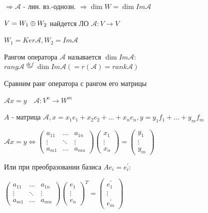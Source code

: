 \documentclass[12pt]{article}
\begin{document}
    $\Longrightarrow \mathcal{A}$ - лин. вз.-однозн. $\Longrightarrow \dim W = \dim Im \mathcal{A}$

    $V = W_1 \oplus W_2$ найдется ЛО $\mathcal{A} : V \rightarrow V$

    $W_1 = Ker \mathcal{A}, W_2 = Im \mathcal{A}$

    \Def Рангом оператора $\mathcal{A}$ называется $\dim Im \mathcal{A}$: $rang \mathcal{A} \stackrel{def}{=} \dim Im \mathcal{A} (= r(\mathcal{A}) = rank \mathcal{A})$

    \Nota Сравним ранг оператора с рангом его матрицы

    $\mathcal{A} x = y \quad \mathcal{A} : V^n \rightarrow W^m$

    $A$ - матрица $\mathcal{A}, x = x_1 e_1 + x_2 e_2 + \dots + x_n e_n, y = y_1 f_1 + \dots + y_m f_m$

    $\mathcal{A}x = y \Longleftrightarrow \begin{pmatrix}
         a_{11} & \dots & a_{1n} \\
         \vdots & \ddots & \vdots \\
         a_{m1} & \dots & a_{mn}
    \end{pmatrix} \begin{pmatrix}
         x_1 \\
         \vdots \\
         x_n
    \end{pmatrix} = \begin{pmatrix}
         y_1 \\
         \vdots \\
         y_m
    \end{pmatrix}$

    Или при преобразовании базиса $Ae_i = e^\prime_i$:

    $\begin{pmatrix}
         a_{11} & \dots & a_{1n} \\
         \vdots & \ddots & \vdots \\
         a_{m1} & \dots & a_{mn}
    \end{pmatrix} \begin{pmatrix}
         e_1 \\
         \vdots \\
         e_n
    \end{pmatrix}^T = \begin{pmatrix}
         e_1^\prime \\
         \vdots \\
         e_m^\prime
    \end{pmatrix}$
\end{document}

